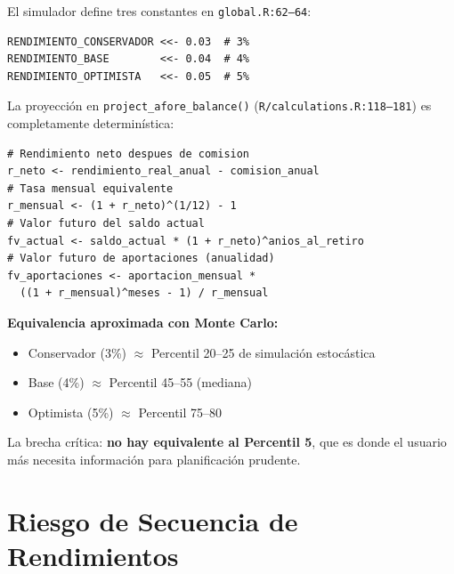 \documentclass[11pt,a4paper]{report}
\begin{document}
\begin{tcolorbox}[colback=orange!5!white, colframe=orange!75!black, title=\textbf{Aplicaci\'on en C\'odigo: Escenarios Determin\'isticos como Proxy}]
El simulador define tres constantes en \texttt{global.R:62--64}:

\begin{lstlisting}
RENDIMIENTO_CONSERVADOR <<- 0.03  # 3%
RENDIMIENTO_BASE        <<- 0.04  # 4%
RENDIMIENTO_OPTIMISTA   <<- 0.05  # 5%
\end{lstlisting}

La proyecci\'on en \texttt{project\_afore\_balance()} (\texttt{R/calculations.R:118--181}) es completamente determin\'istica:

\begin{lstlisting}
# Rendimiento neto despues de comision
r_neto <- rendimiento_real_anual - comision_anual
# Tasa mensual equivalente
r_mensual <- (1 + r_neto)^(1/12) - 1
# Valor futuro del saldo actual
fv_actual <- saldo_actual * (1 + r_neto)^anios_al_retiro
# Valor futuro de aportaciones (anualidad)
fv_aportaciones <- aportacion_mensual *
  ((1 + r_mensual)^meses - 1) / r_mensual
\end{lstlisting}

\textbf{Equivalencia aproximada con Monte Carlo:}
\begin{itemize}
  \item Conservador (3\%) $\approx$ Percentil 20--25 de simulaci\'on estoc\'astica
  \item Base (4\%) $\approx$ Percentil 45--55 (mediana)
  \item Optimista (5\%) $\approx$ Percentil 75--80
\end{itemize}

La brecha cr\'itica: \textbf{no hay equivalente al Percentil 5}, que es donde el usuario m\'as necesita informaci\'on para planificaci\'on prudente.
\end{tcolorbox}


\section{Riesgo de Secuencia de Rendimientos}
\end{document}
